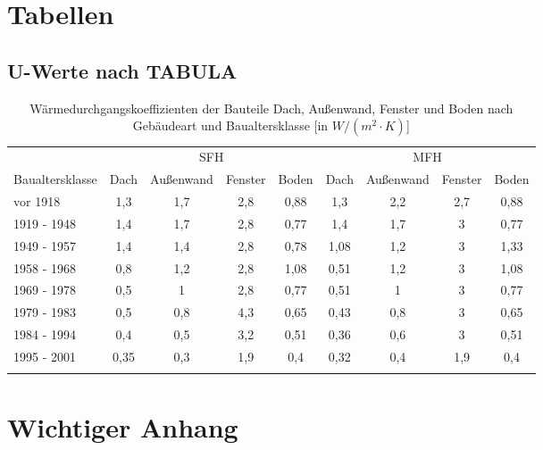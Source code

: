 \chapter{Tabellen}


\section{U-Werte nach TABULA}

\begin{table}[H]\centering
\begin{tabular}{l|cccc|cccc}
\toprule[1.5pt]
 & \multicolumn{4}{c}{SFH}& \multicolumn{4}{c}{MFH}  \\ 
\cmidrule[1.5pt]{2-9}
Baualtersklasse & Dach & Außenwand & Fenster & Boden & Dach & Außenwand & Fenster & Boden \\ \addlinespace[5pt]
\midrule[2pt]
vor 1918 & 1,3 & 1,7 & 2,8 & 0,88 & 1,3 & 2,2 & 2,7 & 0,88 \\
\midrule
1919 - 1948 & 1,4 & 1,7 & 2,8 & 0,77 & 1,4 & 1,7 & 3 & 0,77 \\
\midrule
1949 - 1957 & 1,4 & 1,4 & 2,8 & 0,78 & 1,08 & 1,2 & 3 & 1,33 \\
\midrule
1958 - 1968 & 0,8 & 1,2 & 2,8 & 1,08 & 0,51 & 1,2 & 3 & 1,08 \\
\midrule
1969 - 1978 & 0,5 & 1 & 2,8 & 0,77 & 0,51 & 1 & 3 & 0,77 \\
\midrule
1979 - 1983 & 0,5 & 0,8 & 4,3 & 0,65 & 0,43 & 0,8 & 3 & 0,65 \\
\midrule
1984 - 1994 & 0,4 & 0,5 & 3,2 & 0,51 & 0,36 & 0,6 & 3 & 0,51 \\
\midrule
1995 - 2001 & 0,35 & 0,3 & 1,9 & 0,4 & 0,32 & 0,4 & 1,9 & 0,4\\
\bottomrule[1.5pt] \addlinespace[10pt]
\end{tabular}
\caption{Wärmedurchgangskoeffizienten der Bauteile Dach, Außenwand, Fenster und Boden nach Gebäudeart und Baualtersklasse [in \(W/(m^2 \cdot K)\)]}
\label{tab: TabelleA1}
\end{table}


\chapter{Wichtiger Anhang}
